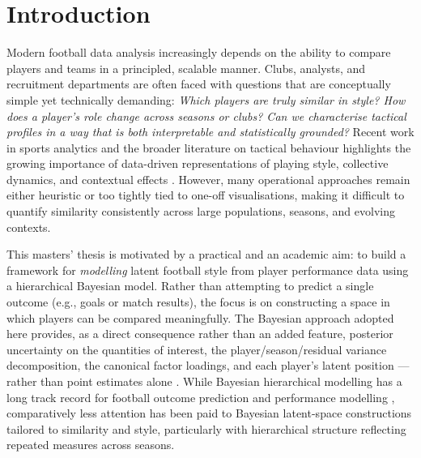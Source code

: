 \documentclass{fmetfm}
\begin{document}
\begin{abstract}
The resulting framework offers a reproducible route from raw event data to a low-dimensional representation of playing style, directly applicable to style-based scouting
shortlists that complement, rather than replace, judgement on age, price, and performance.

\end{abstract}

\tableofcontents

\mainmatter

\chapter{Introduction}

Modern football data analysis increasingly depends on the ability to compare players and teams in a principled, scalable manner. Clubs, analysts, and recruitment departments are often faced with questions that are conceptually simple yet technically demanding: \emph{Which players are truly similar in style? How does a player’s role change across seasons or clubs? Can we characterise tactical profiles in a way that is both interpretable and statistically grounded?} Recent work in sports analytics and the broader literature on tactical behaviour highlights the growing importance of data-driven representations of playing style, collective dynamics, and contextual effects \cite{teixeira2025mapping,orucc2024analysis}. However, many operational approaches remain either heuristic or too tightly tied to one-off visualisations, making it difficult to quantify similarity consistently across large populations, seasons, and evolving contexts.

This masters' thesis is motivated by a practical and an academic aim: to build a framework for \emph{modelling} latent football style from player performance data using a hierarchical Bayesian model. Rather than attempting to predict a single outcome (e.g., goals or match results), the focus is on constructing a space in which players can be compared meaningfully. The Bayesian approach adopted here provides, as a direct consequence rather than an added feature, posterior uncertainty on the quantities of interest, the player/season/residual variance decomposition, the canonical factor loadings, and each player's latent position --- rather than point estimates alone \cite{swinton2023bayesian}. While Bayesian hierarchical modelling has a long track record for football outcome prediction \cite{baio2010bayesian} and performance modelling \cite{ribeiro2025bayesian}, comparatively less attention has been paid to Bayesian latent-space constructions tailored to similarity and style, particularly with hierarchical structure reflecting repeated measures across seasons.
\end{document}

